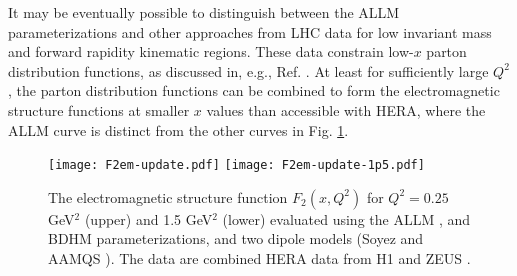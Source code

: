 \documentclass[aps,10pt,twocolumn,tightenlines]{revtex4-1}
\begin{document}
It may be eventually possible to distinguish between the ALLM parameterizations and other approaches from LHC data for low invariant mass
and forward rapidity kinematic regions. 
These data constrain low-$x$ parton distribution functions, as discussed in, e.g., Ref.
\cite{Gauld:2016kpd}. At least for sufficiently large $Q^2$, the parton distribution functions can be combined to
form the electromagnetic structure functions at smaller $x$ values than accessible with HERA, where the ALLM
curve is distinct from the other curves in Fig. \ref{fig:F2}.

\begin{figure}[htb]
\centering
	\texttt{[image: F2em-update.pdf]}
	\texttt{[image: F2em-update-1p5.pdf]}
	
	\caption{The electromagnetic structure function $F_2(x,Q^2)$ for $Q^2=0.25$ GeV$^2$ (upper) and
	1.5 GeV$^2$ (lower) evaluated using 
	the ALLM \cite{Abramowicz:1997ms}, 
	and BDHM \cite{Block:2014kza} parameterizations, and two dipole models (Soyez \cite{Soyez:2007kg} and
	AAMQS \cite{Albacete:2015zra}). The data are combined HERA data from H1 and ZEUS \cite{Aaron:2009aa}.}
	\label{fig:F2}
\end{figure}
\end{document}
